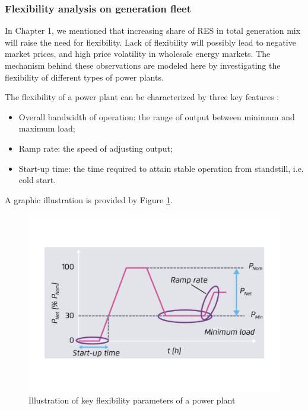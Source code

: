 
\subsubsection{Flexibility analysis on  generation fleet}
In Chapter 1, we mentioned that increasing share of RES in total generation mix will raise the need for flexibility. Lack of flexibility will possibly lead to negative market prices, and high price volatility in wholesale energy markets. The mechanism behind these observations are modeled here by investigating the flexibility of different types of power plants. 

The flexibility of a power plant can be characterized by three key features \cite{AgoraEnergiewende2017}:

\begin{itemize}
	\item Overall bandwidth of operation: the range of output between minimum and maximum load;
	\item Ramp rate: the speed of adjusting output;
	\item Start-up time: the time required to attain stable operation from standstill, i.e. cold start.
\end{itemize}

A graphic illustration is provided by Figure \ref{fig:power-plant-flexibility}. 

\begin{figure}[h!]
	\includegraphics[width=0.95\linewidth]{Figures/PowerPlantFlexibility.pdf}
	\caption{Illustration of key flexibility parameters of a power plant\cite{AgoraEnergiewende2017}}	\label{fig:power-plant-flexibility}
\end{figure}

